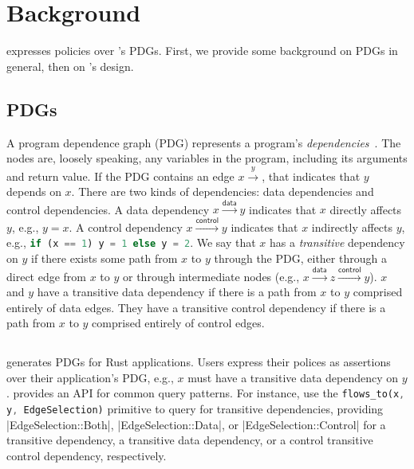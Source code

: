 \chapter{Background}

\syslang{} expresses policies over \sys{}'s PDGs.
%
First, we provide some background on PDGs in general, then on \sys{}'s design.

\section{PDGs}
A program dependence graph (PDG) represents a program's \emph{dependencies}~\cite{ferranteProgramDependenceGraph1987}.
%
The nodes are, loosely speaking, any variables in the program, including its arguments and return value.
%
If the PDG contains an edge $x \xrightarrow y$, that indicates that $y$ depends on $x$.
%
There are two kinds of dependencies: data dependencies and control dependencies.
%
A data dependency $x \xrightarrow{\mathsf{data}} y$ indicates that $x$ directly affects $y$, e.g., $y = x$.
%
A control dependency $x \xrightarrow{\mathsf{control}} y$ indicates that $x$ indirectly affects $y$, 
e.g., \lstinline[language=Rust]|if (x == 1) y = 1 else y = 2|.
%
We say that $x$ has a \emph{transitive} dependency on $y$ if there exists some path from $x$ to $y$ through the PDG,
either through a direct edge from $x$ to $y$ or through intermediate nodes 
(e.g., $x \xrightarrow{\mathsf{data}} z \xrightarrow{\mathsf{control}} y$).
%
$x$ and $y$ have a transitive data dependency if there is a path from $x$ to $y$ comprised entirely of data edges.
%
They have a transitive control dependency if there is a path from $x$ to $y$ comprised entirely of control edges.

\section{\sys{}}

\sys{} generates PDGs for Rust applications.
%
Users express their polices as assertions over their application's PDG, 
e.g., $x$ must have a transitive data dependency on $y$.
%
\sys{} provides an API for common query patterns.
%
For instance, \writers{} use the \lstinline[language=Rust]|flows_to(x, y, EdgeSelection)| primitive to query for transitive dependencies, 
providing |EdgeSelection::Both|, |EdgeSelection::Data|, or |EdgeSelection::Control| for a transitive dependency,
a transitive data dependency, or a control transitive control dependency, respectively.

